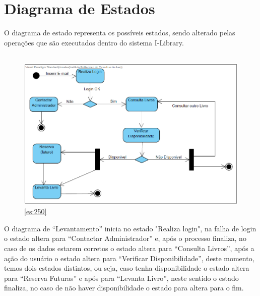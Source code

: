 \section{Diagrama de Estados}

\par O diagrama de estado representa os possíveis estados, sendo alterado pelas operações que são executados dentro do sistema I-Library.

\subsection{}

\begin{figure}[H]
	\centering
	\includegraphics[width=1\linewidth]{./img/Diagrama_E/DE_Requisicao.png}  %
	\caption{\ref{es:250}}
	\label{fig:chap250}
\end{figure}

\par O diagrama de “Levantamento” inicia no estado "Realiza login", na falha de login o estado altera para “Contactar Administrador” e, após o processo finaliza, no caso de os dados estarem corretos o estado altera para “Consulta Livros”, após a ação do usuário o estado altera para “Verificar Disponibilidade”, deste momento, temos dois estados distintos, ou seja, caso tenha disponibilidade o estado altera para “Reserva Futuras” e após para “Levanta Livro”, neste sentido o estado finaliza, no caso de não haver disponibilidade o estado para altera para o fim.


\newpage


\newpage